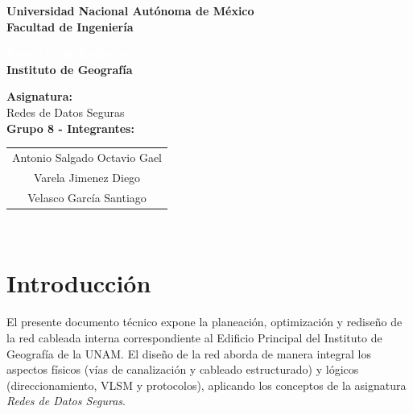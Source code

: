 \documentclass[11pt, letterpaper]{article}
\begin{document}
\begin{titlepage}
    \centering
    \vspace*{1.5cm}
    
    {\huge \textbf{\textcolor{AzulUNAM}{Universidad Nacional Autónoma de México}}}\\[1cm]
    {\LARGE \textbf{\textcolor{OroUNAM}{Facultad de Ingeniería}}}\\[1.5cm]
    
    \begin{tcolorbox}[enhanced, colback=AzulUNAM, colframe=AzulUNAM, arc=2mm, 
                      boxrule=0pt, drop fuzzy shadow, top=1cm, bottom=1cm]
        \centering
        {\huge \textbf{\textcolor{white}{Proyecto de Rediseño}}}\\[0.3cm]
        {\LARGE \textbf{\textcolor{OroUNAM}{Instituto de Geografía}}}
    \end{tcolorbox}
    \vspace{1.5cm}
    
    {\Large \textbf{Asignatura:}}\\\vspace{0.2cm}
    {\large Redes de Datos Seguras}\\[1.5cm]
    
    {\Large \textbf{Grupo 8 - Integrantes:}}\\\vspace{0.3cm}
    {\large 
    \begin{tabular}{c}
         Antonio Salgado Octavio Gael \\
         Varela Jimenez Diego \\
         Velasco García Santiago 
    \end{tabular}
    }\\[2cm]
    

    
\end{titlepage}

\tableofcontents
\newpage


\section{Introducción}
El presente documento técnico expone la planeación, optimización y rediseño de la red cableada interna correspondiente al Edificio Principal del Instituto de Geografía de la UNAM. El diseño de la red aborda de manera integral los aspectos físicos (vías de canalización y cableado estructurado) y lógicos (direccionamiento, VLSM y protocolos), aplicando los conceptos de la asignatura \textit{Redes de Datos Seguras}.
\end{document}
